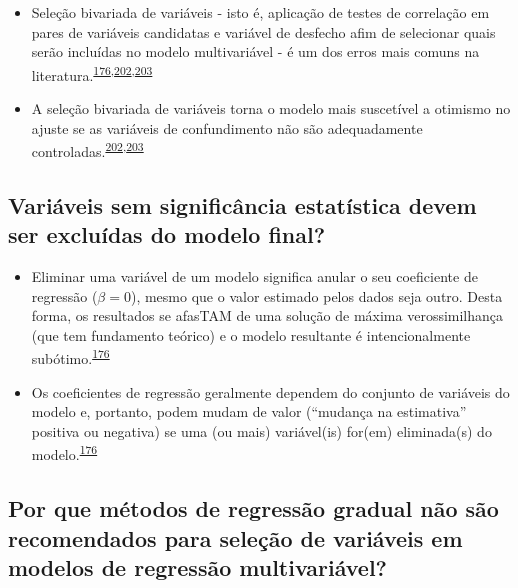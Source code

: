 \documentclass[
  a4paper,
]{book}
\begin{document}
\begin{itemize}
\item
  Seleção bivariada de variáveis - isto é, aplicação de testes de correlação em pares de variáveis candidatas e variável de desfecho afim de selecionar quais serão incluídas no modelo multivariável - é um dos erros mais comuns na literatura.\textsuperscript{\protect\hyperlink{ref-heinze2016}{176},\protect\hyperlink{ref-Dales1978}{202},\protect\hyperlink{ref-Sun1996}{203}}
\item
  A seleção bivariada de variáveis torna o modelo mais suscetível a otimismo no ajuste se as variáveis de confundimento não são adequadamente controladas.\textsuperscript{\protect\hyperlink{ref-Dales1978}{202},\protect\hyperlink{ref-Sun1996}{203}}
\end{itemize}

\hypertarget{variuxe1veis-sem-significuxe2ncia-estatuxedstica-devem-ser-excluuxeddas-do-modelo-final}{%
\subsection{Variáveis sem significância estatística devem ser excluídas do modelo final?}\label{variuxe1veis-sem-significuxe2ncia-estatuxedstica-devem-ser-excluuxeddas-do-modelo-final}}

\begin{itemize}
\item
  Eliminar uma variável de um modelo significa anular o seu coeficiente de regressão (\(\beta = 0\)), mesmo que o valor estimado pelos dados seja outro. Desta forma, os resultados se afasTAM de uma solução de máxima verossimilhança (que tem fundamento teórico) e o modelo resultante é intencionalmente subótimo.\textsuperscript{\protect\hyperlink{ref-heinze2016}{176}}
\item
  Os coeficientes de regressão geralmente dependem do conjunto de variáveis do modelo e, portanto, podem mudam de valor (``mudança na estimativa'' positiva ou negativa) se uma (ou mais) variável(is) for(em) eliminada(s) do modelo.\textsuperscript{\protect\hyperlink{ref-heinze2016}{176}}
\end{itemize}

\hypertarget{por-que-muxe9todos-de-regressuxe3o-gradual-nuxe3o-suxe3o-recomendados-para-seleuxe7uxe3o-de-variuxe1veis-em-modelos-de-regressuxe3o-multivariuxe1vel}{%
\subsection{Por que métodos de regressão gradual não são recomendados para seleção de variáveis em modelos de regressão multivariável?}\label{por-que-muxe9todos-de-regressuxe3o-gradual-nuxe3o-suxe3o-recomendados-para-seleuxe7uxe3o-de-variuxe1veis-em-modelos-de-regressuxe3o-multivariuxe1vel}}
\end{document}
